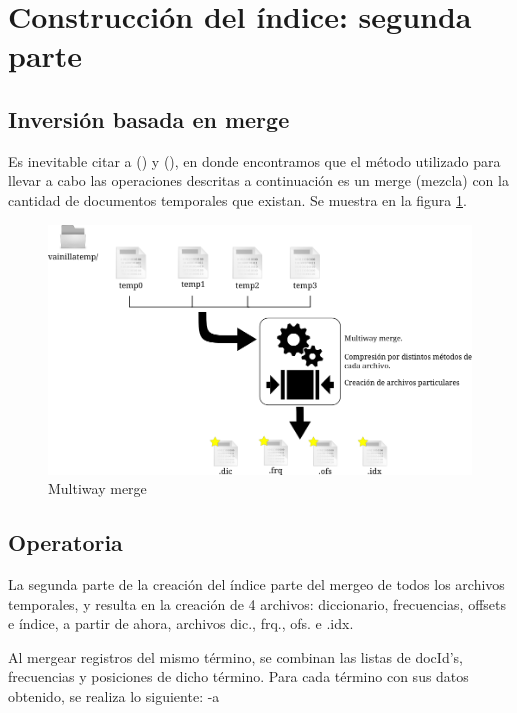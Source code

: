\section{Construcción del índice: segunda parte}\label{sec:indice2}

\subsection{Inversión basada en merge}

Es inevitable citar a \citet[p. ~14]{Zobel06invertedfiles} (\citeyear{Zobel06invertedfiles}) y \citet[p.~238]{WittenMoffatBell99} (\citeyear{WittenMoffatBell99}), en donde encontramos que el método utilizado para llevar a cabo las operaciones descritas a continuación es un merge (mezcla) con la cantidad de documentos temporales que existan. Se muestra en la figura \ref{fig:indice2_1}.

\begin{figure}[!ht]
\centering
    \includegraphics[scale=0.8]{./Images/indice2_1.png}
\caption{Multiway merge}
\label{fig:indice2_1}
\end{figure}


\subsection{Operatoria}

La segunda parte de la creación del índice parte del mergeo de todos los archivos temporales, y resulta en la creación de 4 archivos: diccionario, frecuencias, offsets e índice, a partir de ahora, archivos dic., frq., ofs. e .idx.

Al mergear registros del mismo término, se combinan las listas de docId's, frecuencias y posiciones de dicho término. Para cada término con sus datos obtenido, se realiza lo siguiente: -a

